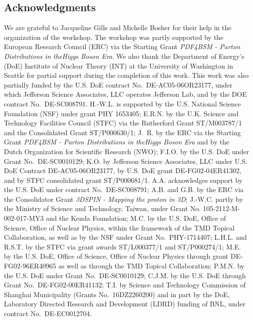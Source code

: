\subsection*{Acknowledgments}

We are grateful to Jacqueline Gills and Michelle Bosher for their help in the
organization of the workshop.
%
The workshop was partly supported by the European Research Council (ERC) via 
the Starting Grant {\it PDF4BSM - Parton Distributions in theHiggs Boson Era}.
%
We also thank the Department of Energy's (DoE) Institute of Nuclear Theory 
(INT) at the University of Washington in Seattle for partial support during 
the completion of this work.
%
This work was also partially funded by the U.S. DoE contract 
No.~DE-AC05-06OR23177, under which Jefferson Science Associates, 
LLC operates Jefferson Lab, and by the DOE contract No.~DE-SC008791. 
% 
H.-W.L. is supported by the U.S. National Science Foundation (NSF) under grant 
PHY 1653405; E.R.N. by the U.K. Science and Technology Facilities Council 
(STFC) via the Rutherford Grant ST/M003787/1 and the Consolidated Grant 
ST/P000630/1; J.~R. by the ERC via the Starting 
Grant {\it PDF4BSM - Parton Distributions in theHiggs Boson Era} and by the 
Dutch Organization for Scientific Research (NWO); F.I.O. by the U.S. DoE under 
Grant No.~DE-SC0010129; K.O. by Jefferson Science Associates, LLC under U.S. 
DoE Contract DE-AC05-06OR23177, by U.S. DoE grant DE-FG02-04ER41302, 
and  by STFC consolidated grant ST/P000681/1.
%
A.A. acknowledges support by the U.S. DoE under contract No.~DE-SC008791;
A.B. and G.B. by the ERC via the Consolidator Grant {\it 3DSPIN - Mapping the
proton in 3D};
J.-W.C. partly by the Ministry of Science and Technology, Taiwan,
under Grant No. 105-2112-M-002-017-MY3 and the Kenda Foundation;
M.C. by the U.S. DoE, Office of Science, Office of Nuclear Physics, within the 
framework of the TMD Topical Collaboration, as well as by the NSF under Grant 
No.~PHY-1714407;
L.H.L. and R.S.T. by the STFC via grant awards ST/L000377/1 and ST/P000274/1;
M.E. by the U.S. DoE, Office of Science, Office of Nuclear Physics through 
grant DE-FG02-96ER40965 as well as through the TMD Topical Collaboration;
P.M.N. by the U.S. DoE under Grant No.~DE-SC0010129; 
C.J.M. by the U.S. DoE through Grant No.~DE-FG02-00ER41132;
T.I. by Science and Technology Commission of Shanghai Municipality 
(Grants No.~16DZ2260200) and in part by the DoE, Laboratory Directed Research 
and Development (LDRD) funding of BNL, under contract No.~DE-EC0012704.



